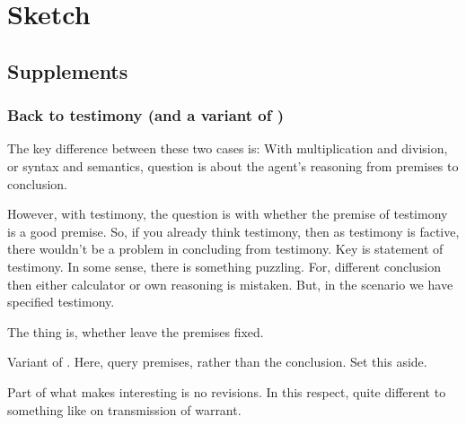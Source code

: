 \chapter{Sketch}
\label{cha:sketch}

\section{Supplements}
\label{sec:overview:supplements}

\subsection{Back to testimony (and a variant of \zS{})}

\begin{note}
  The key difference between these two cases is:
  With multiplication and division, or syntax and semantics, question is about the agent's reasoning from premises to conclusion.

  However, with testimony, the question is with whether the premise of testimony is a good premise.
  So, if you already think testimony, then as testimony is factive, there wouldn't be a problem in concluding from testimony.
  Key is statement of testimony.
  In some sense, there is something puzzling.
  For, different conclusion then either calculator or own reasoning is mistaken.
  But, in the scenario we have specified testimony.

  The thing is, whether leave the premises fixed.

  Variant of \zS{}.
  Here, query premises, rather than the conclusion.
  Set this aside.

  Part of what makes \zS{} interesting is no revisions.
  In this respect, quite different to something like \citeauthor{Wright:2011wn} on transmission of warrant.
\end{note}


